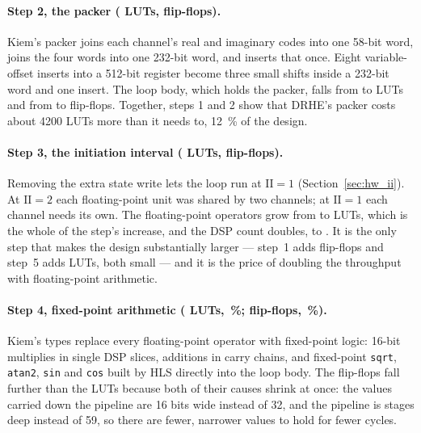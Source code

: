 \paragraph{Step 2, the packer (  LUTs,
  flip-flops).} Kiem's packer joins
each channel's real and imaginary codes into one 58-bit word, joins the four
words into one 232-bit word, and inserts that once. Eight variable-offset
inserts into a 512-bit register become three small shifts inside a 232-bit word
and one insert. The loop body, which holds the packer, falls from
 to  LUTs and from
 to  flip-flops. Together, steps 1
and 2 show that DRHE's packer costs about \num{4200} LUTs more than it needs
to, \SI{12}{\percent} of the design.

\paragraph{Step 3, the initiation interval (
 LUTs,  
flip-flops).} Removing the extra state write lets the loop run at
$\mathrm{II} = 1$ (Section~\ref{sec:hw_ii}). At $\mathrm{II} = 2$ each
floating-point unit was shared by two channels; at $\mathrm{II} = 1$ each
channel needs its own. The floating-point operators grow from
 to  LUTs, which is the whole of the
step's increase, and the DSP count doubles, to . It is the
only step that makes the design substantially larger --- step~1 adds
 flip-flops and step~5 adds  LUTs, both small
--- and it is the price of doubling the throughput with floating-point
arithmetic.

\paragraph{Step 4, fixed-point arithmetic ( 
LUTs, \,\%;  
flip-flops, \,\%).} Kiem's types replace every
floating-point operator with fixed-point logic: 16-bit multiplies in single DSP
slices, additions in carry chains, and fixed-point \texttt{sqrt},
\texttt{atan2}, \texttt{sin} and \texttt{cos} built by HLS directly into the
loop body. The flip-flops fall further than the LUTs because both of their
causes shrink at once: the values carried down the pipeline are 16 bits wide
instead of 32, and the pipeline is  stages deep instead of
59, so there are fewer, narrower values to hold for fewer cycles.

